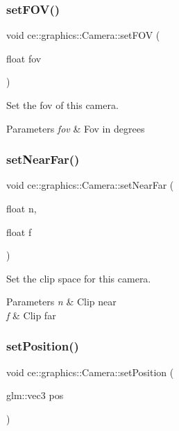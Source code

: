 \subsubsection{\texorpdfstring{set\+F\+O\+V()}{setFOV()}}
{\footnotesize\ttfamily void ce\+::graphics\+::\+Camera\+::set\+F\+OV (\begin{DoxyParamCaption}\item[{float}]{fov }\end{DoxyParamCaption})}



Set the fov of this camera. 


\begin{DoxyParams}{Parameters}
{\em fov} & Fov in degrees \\
\hline
\end{DoxyParams}
\mbox{\label{classce_1_1graphics_1_1_camera_a0908e7c08307000941dd51f01e07e582}} 
\subsubsection{\texorpdfstring{set\+Near\+Far()}{setNearFar()}}
{\footnotesize\ttfamily void ce\+::graphics\+::\+Camera\+::set\+Near\+Far (\begin{DoxyParamCaption}\item[{float}]{n,  }\item[{float}]{f }\end{DoxyParamCaption})}



Set the clip space for this camera. 


\begin{DoxyParams}{Parameters}
{\em n} & Clip near \\
\hline
{\em f} & Clip far \\
\hline
\end{DoxyParams}
\mbox{\label{classce_1_1graphics_1_1_camera_a03003f6beb426e19d497222977e6568a}} 
\subsubsection{\texorpdfstring{set\+Position()}{setPosition()}\hspace{0.1cm}{\footnotesize\ttfamily [1/2]}}
{\footnotesize\ttfamily void ce\+::graphics\+::\+Camera\+::set\+Position (\begin{DoxyParamCaption}\item[{glm\+::vec3}]{pos }\end{DoxyParamCaption})}



